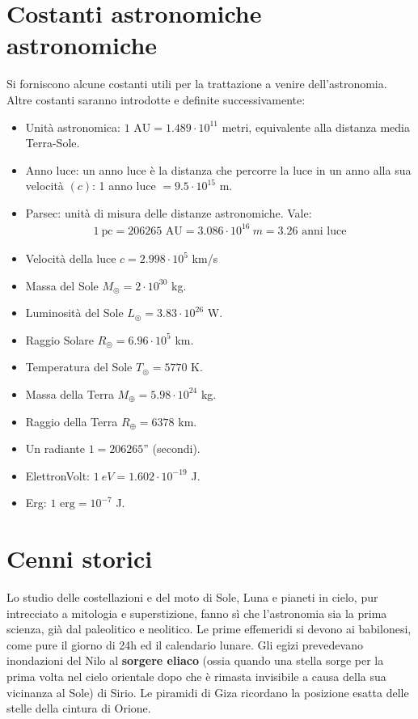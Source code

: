 \documentclass[a4paper, oneside]{book}
\begin{document}
\section{Costanti astronomiche astronomiche}
Si forniscono alcune costanti utili per la trattazione a venire 
dell'astronomia. Altre costanti saranno introdotte e definite successivamente:
\begin{itemize}
    \item Unità astronomica: $1 \text{ AU} = 1.489 \cdot 10^{11}$ metri, equivalente
    alla distanza media Terra-Sole.
    \item Anno luce: un anno luce è la distanza che percorre la luce in 
    un anno alla sua velocità $(c)$: 1 anno luce $= 9.5 \cdot 10^{15}$ m. 
        \item Parsec: unità di misura delle distanze astronomiche. Vale:
    \begin{gather*}
        1 \ \text{pc} = 206265 \text{ AU} = 3.086 \cdot 10^{16} \ m = 3.26 \text{ anni luce}
    \end{gather*}
    \item Velocità della luce $c = 2.998 \cdot 10^{5}$ km/s 
    \item Massa del Sole $M_\circledcirc = 2\cdot 10^{30}$ kg.
    \item Luminosità del Sole $L_\circledcirc = 3.83 \cdot 10^{26}$ W.
    \item Raggio Solare $R_\circledcirc = 6.96 \cdot 10^{5}$ km.
    \item Temperatura del Sole $T_\circledcirc = 5770$ K. 
    \item Massa della Terra $M_\oplus = 5.98 \cdot 10^{24}$ kg.
    \item Raggio della Terra $R_\oplus = 6378$ km. 
    \item Un radiante $1 = 206265$'' (secondi).
    \item ElettronVolt: $1 \ eV = 1.602 \cdot 10^{-19}$ J.
    \item Erg: $1 \text{ erg} = 10^{-7}$ J.
\end{itemize}

\section{Cenni storici}
Lo studio delle costellazioni e del moto di Sole, Luna e pianeti in 
cielo, pur intrecciato a mitologia e superstizione, fanno sì che 
l’astronomia sia la prima scienza, già dal paleolitico e neolitico.
Le prime effemeridi si devono ai babilonesi, come pure il giorno di 
24h ed il calendario lunare. Gli egizi prevedevano inondazioni del 
Nilo al \textbf{sorgere eliaco} (ossia quando una stella 
sorge per la prima volta nel cielo orientale dopo che è rimasta invisibile a causa
della sua vicinanza al Sole)
di Sirio. Le piramidi di Giza ricordano la 
posizione esatta delle stelle della cintura di Orione.
\end{document}
